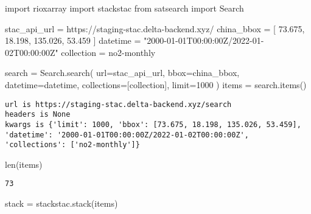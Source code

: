 \documentclass[
  letterpaper,
  DIV=11,
  numbers=noendperiod]{scrreprt}
\newenvironment{Shaded}{\begin{snugshade}}{\end{snugshade}}
\newcommand{\BuiltInTok}[1]{\textcolor[rgb]{0.00,0.46,0.62}{#1}}
\newcommand{\DecValTok}[1]{\textcolor[rgb]{0.68,0.00,0.00}{#1}}
\newcommand{\FloatTok}[1]{\textcolor[rgb]{0.68,0.00,0.00}{#1}}
\newcommand{\ImportTok}[1]{\textcolor[rgb]{0.00,0.46,0.62}{#1}}
\newcommand{\NormalTok}[1]{\textcolor[rgb]{0.00,0.46,0.62}{#1}}
\newcommand{\OperatorTok}[1]{\textcolor[rgb]{0.37,0.37,0.37}{#1}}
\newcommand{\StringTok}[1]{\textcolor[rgb]{0.13,0.47,0.30}{#1}}
\begin{document}
\begin{Shaded}
\begin{Highlighting}[]
\ImportTok{import}\NormalTok{ rioxarray}
\ImportTok{import}\NormalTok{ stackstac}
\ImportTok{from}\NormalTok{ satsearch }\ImportTok{import}\NormalTok{ Search}
\end{Highlighting}
\end{Shaded}

\begin{Shaded}
\begin{Highlighting}[]
\NormalTok{stac\_api\_url }\OperatorTok{=} \StringTok{\textquotesingle{}https://staging{-}stac.delta{-}backend.xyz/\textquotesingle{}}
\NormalTok{china\_bbox }\OperatorTok{=}\NormalTok{ [}
    \FloatTok{73.675}\NormalTok{,}
    \FloatTok{18.198}\NormalTok{,}
    \FloatTok{135.026}\NormalTok{,}
    \FloatTok{53.459}
\NormalTok{]}
\NormalTok{datetime }\OperatorTok{=} \StringTok{"2000{-}01{-}01T00:00:00Z/2022{-}01{-}02T00:00:00Z"}
\NormalTok{collection }\OperatorTok{=} \StringTok{\textquotesingle{}no2{-}monthly\textquotesingle{}}

\NormalTok{search }\OperatorTok{=}\NormalTok{ Search.search(}
\NormalTok{    url}\OperatorTok{=}\NormalTok{stac\_api\_url,}
\NormalTok{    bbox}\OperatorTok{=}\NormalTok{china\_bbox,}
\NormalTok{    datetime}\OperatorTok{=}\NormalTok{datetime,}
\NormalTok{    collections}\OperatorTok{=}\NormalTok{[collection],}
\NormalTok{    limit}\OperatorTok{=}\DecValTok{1000}
\NormalTok{)}
\NormalTok{items }\OperatorTok{=}\NormalTok{ search.items()}
\end{Highlighting}
\end{Shaded}

\begin{verbatim}
url is https://staging-stac.delta-backend.xyz/search
headers is None
kwargs is {'limit': 1000, 'bbox': [73.675, 18.198, 135.026, 53.459], 'datetime': '2000-01-01T00:00:00Z/2022-01-02T00:00:00Z', 'collections': ['no2-monthly']}
\end{verbatim}

\begin{Shaded}
\begin{Highlighting}[]
\BuiltInTok{len}\NormalTok{(items)}
\end{Highlighting}
\end{Shaded}

\begin{verbatim}
73
\end{verbatim}

\begin{Shaded}
\begin{Highlighting}[]
\NormalTok{stack }\OperatorTok{=}\NormalTok{ stackstac.stack(items)}
\end{Highlighting}
\end{Shaded}
\end{document}

